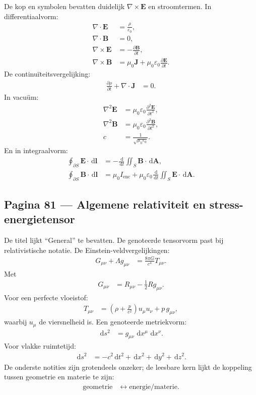 \documentclass[11pt]{article}
\newcommand{\dd}{\,\mathrm{d}}
\newcommand{\pd}[2]{\frac{\partial #1}{\partial #2}}
\newcommand{\td}[2]{\frac{\dd #1}{\dd #2}}
\newcommand{\vect}[1]{\mathbf{#1}}
\newcommand{\onzeker}[1]{\textcolor{red!70!black}{#1}}
\begin{document}
De kop en symbolen bevatten duidelijk $\nabla\times\vect{E}$ en stroomtermen. In differentiaalvorm:
\begin{align*}
\nabla\cdot\vect{E}
&=
\frac{\rho}{\varepsilon_0},\\
\nabla\cdot\vect{B}
&=
0,\\
\nabla\times\vect{E}
&=
-\pd{\vect{B}}{t},\\
\nabla\times\vect{B}
&=
\mu_0\vect{J}
+
\mu_0\varepsilon_0\pd{\vect{E}}{t}.
\end{align*}
De continuïteitsvergelijking:
\begin{align*}
\pd{\rho}{t}
+
\nabla\cdot\vect{J}
&=
0.
\end{align*}
In vacuüm:
\begin{align*}
\nabla^2\vect{E}
&=
\mu_0\varepsilon_0\pd{^2\vect{E}}{t^2},\\
\nabla^2\vect{B}
&=
\mu_0\varepsilon_0\pd{^2\vect{B}}{t^2},\\
c
&=
\frac{1}{\sqrt{\mu_0\varepsilon_0}}.
\end{align*}
En in integraalvorm:
\begin{align*}
\oint_{\partial S}\vect{E}\cdot\dd\vect{l}
&=
-\td{}{t}\iint_S \vect{B}\cdot\dd\vect{A},\\
\oint_{\partial S}\vect{B}\cdot\dd\vect{l}
&=
\mu_0 I_\mathrm{enc}
+
\mu_0\varepsilon_0\td{}{t}
\iint_S \vect{E}\cdot\dd\vect{A}.
\end{align*}

\subsection*{Pagina 81 --- Algemene relativiteit en stress-energietensor}

De titel lijkt ``General'' te bevatten. De genoteerde tensorvorm past bij relativistische notatie. De Einstein-veldvergelijkingen:
\begin{align*}
G_{\mu\nu}
+
\Lambda g_{\mu\nu}
&=
\frac{8\pi G}{c^4}T_{\mu\nu}.
\end{align*}
Met
\begin{align*}
G_{\mu\nu}
&=
R_{\mu\nu}
-\frac{1}{2}Rg_{\mu\nu}.
\end{align*}
Voor een perfecte vloeistof:
\begin{align*}
T_{\mu\nu}
&=
\left(\rho+\frac{p}{c^2}\right)u_\mu u_\nu
+
p\,g_{\mu\nu},
\end{align*}
waarbij $u_\mu$ de viersnelheid is. Een genoteerde metriekvorm:
\begin{align*}
\dd s^2
&=
g_{\mu\nu}\,\dd x^\mu\,\dd x^\nu.
\end{align*}
Voor vlakke ruimtetijd:
\begin{align*}
\dd s^2
&=
-c^2\dd t^2+\dd x^2+\dd y^2+\dd z^2.
\end{align*}
De onderste notities zijn grotendeels \onzeker{onzeker}; de leesbare kern lijkt de koppeling tussen geometrie en materie te zijn:
\begin{align*}
\text{geometrie}
&\longleftrightarrow
\text{energie/materie}.
\end{align*}
\end{document}
